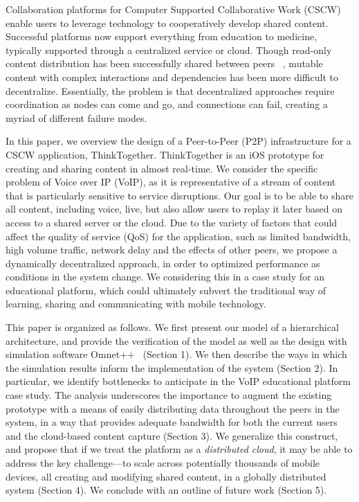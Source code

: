 Collaboration platforms for Computer Supported Collaborative Work (CSCW) enable 
users to leverage technology to cooperatively develop shared content.   
Successful platforms now support everything from education to medicine, 
typically supported through a centralized service or cloud.  Though read-only 
content distribution has been successfully shared between peers ~\cite{CITATION! 
Bit torrent?  :) }, mutable content with complex interactions and dependencies 
has been more difficult to decentralize.   Essentially, the problem is that 
decentralized approaches require coordination as nodes can come and go, and 
connections can fail, creating a myriad of different failure modes.
 
In this paper, we overview the design of a Peer-to-Peer (P2P) infrastructure for 
a CSCW application, ThinkTogether.  ThinkTogether is an iOS prototype for 
creating and sharing content in almost real-time.  We consider the specific 
problem of Voice over IP (VoIP), as it is representative of a stream of content 
that is particularly sensitive to service disruptions.  Our goal is to be able 
to share all content, including voice, live, but also allow users to replay it 
later based on access to a shared server or the cloud.   Due to the variety of 
factors that could affect the quality of service (QoS) for the application, such 
as limited bandwidth, high volume traffic, network delay and the effects of 
other peers, we propose a dynamically decentralized approach, in order to 
optimized performance as conditions in the system change.  We considering this 
in a case study for an educational platform, which could ultimately subvert the 
traditional way of learning, sharing and communicating with mobile technology.
 
This paper is organized as follows.  We first present our model of a 
hierarchical architecture, and provide the verification of the model as well as 
the design with simulation software Omnet++~\cite{CITATION} (Section 1). We then 
describe the ways in which the simulation results inform the implementation of 
the system (Section 2).  In particular, we identify bottlenecks to anticipate in 
the VoIP educational platform case study.  The analysis underscores the 
importance to augment the existing prototype with a means of easily distributing 
data throughout the peers in the system, in a way that provides adequate 
bandwidth for both the current users and the cloud-based content capture 
(Section 3).  We generalize this construct, and propose that if we treat the 
platform as a {\em distributed cloud}, it may be able to address the key 
challenge---to scale across potentially thousands of mobile devices, all 
creating and modifying shared content, in a globally distributed system (Section 
4).  We conclude with an outline of future work (Section 5).
